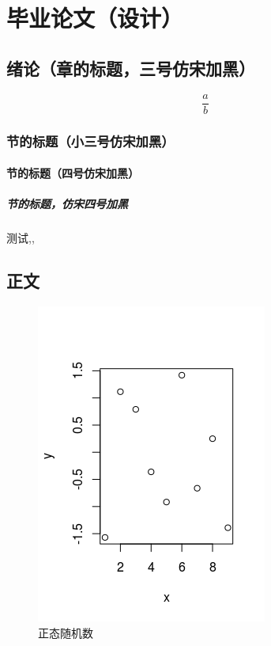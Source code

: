 %
\part{毕业论文（设计）}

\chapter{绪论（章的标题，三号仿宋加黑）}

\begin{equation}
\frac{a}{b}
\end{equation}

\section{节的标题（小三号仿宋加黑）}

\subsection{节的标题（四号仿宋加黑）}

\subsubsection{节的标题，仿宋四号加黑}
测试\cite{small},\textcite{small},\parencite{small}

\chapter{正文}

\begin{figure}[H]
    \centering
    \includegraphics{../assets/sample.png}
    \caption{正态随机数}
\end{figure}

